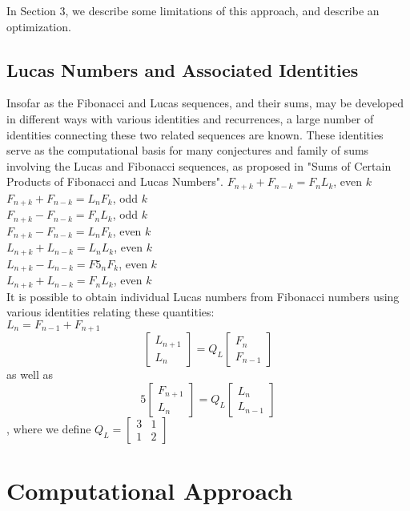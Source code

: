 \documentclass[11pt]{article}
\begin{document}
In Section 3, we describe some limitations of this approach, and describe an optimization.

\subsection{Lucas Numbers and Associated Identities}
Insofar as the Fibonacci and Lucas sequences, and their sums, may be developed in different ways with various identities and recurrences, a large number of identities connecting these two related sequences are known. These identities serve as the computational basis for many conjectures and family of sums involving the Lucas and Fibonacci sequences, as proposed in "Sums of Certain Products of Fibonacci and Lucas Numbers". 
$F_{n+k} + F_{n-k} = F_{n}L_{k}$, even $k$\\
$F_{n+k} + F_{n-k} = L_{n}F_{k}$, odd $k$\\$F_{n+k} - F_{n-k} = F_{n}L_{k}$, odd $k$ \\ $F_{n+k} - F_{n-k} = L_{n}F_{k}$, even $k$ \\ $L_{n+k} + L_{n-k} = L_{n}L_{k}$, even $k$ \\ $L_{n+k} - L_{n-k}= F5_{n}F_{k}$, even $k$ \\ $L_{n+k} + L_{n-k} = F_{n}L_{k}$, even $k$\\ It is possible to obtain individual Lucas numbers from Fibonacci numbers using various identities relating these quantities:\\$L_{n} = F_{n-1} + F_{n+1}$ \\ 
\[
\begin{bmatrix}
L_{n+1} \\
L_{n}
\end{bmatrix} = Q_{L} \begin{bmatrix} F_{n} \\ F_{n-1}\end{bmatrix}
\] 
as well as \\
\[
5\begin{bmatrix}
F_{n+1} \\
L_{n}
\end{bmatrix} = Q_{L} \begin{bmatrix} L_{n} \\ L_{n-1}\end{bmatrix}
\] , where we define $Q_{L} = \begin{bmatrix} 3 & 1 \\ 1 & 2 \end{bmatrix}$

\section{Computational Approach}
\end{document}

